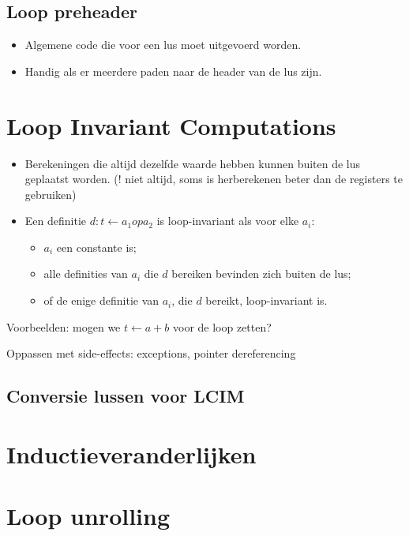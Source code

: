 \subsection{Loop preheader}
\begin{itemize}
	\item Algemene code die voor een lus moet uitgevoerd worden.
	\item Handig als er meerdere paden naar de header van de lus zijn.
\end{itemize}



\section{Loop Invariant Computations}
\begin{itemize}
	\item Berekeningen die altijd dezelfde waarde hebben kunnen buiten de lus geplaatst worden. (! niet altijd, soms is herberekenen beter dan de registers te gebruiken)
	\item Een definitie $d : t \leftarrow a_1 op a_2$ is loop-invariant als voor elke $a_i$:
	\begin{itemize}
		\item $a_i$ een constante is;
		\item alle definities van $a_i$ die $d$ bereiken bevinden zich buiten de lus;
		\item of de enige definitie van $a_i$, die $d$ bereikt, loop-invariant is.
	\end{itemize}
\end{itemize}

Voorbeelden: mogen we $t \leftarrow a + b$ voor de loop zetten?

Oppassen met side-effects: exceptions, pointer dereferencing

\subsection{Conversie lussen voor LCIM}



\section{Inductieveranderlijken}




\section{Loop unrolling}